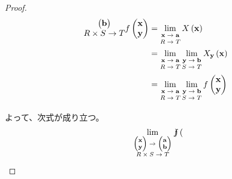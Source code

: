 \documentclass[dvipdfmx]{jsarticle}
\begin{document}
\begin{proof}
\begin{align*}
{\begin{matrix}
\begin{pmatrix}
\mathbf{b} \\
\end{pmatrix} \\ R \times S \rightarrow T \end{matrix}}{f\begin{pmatrix}
\mathbf{x} \\
\mathbf{y} \\
\end{pmatrix}} &= \lim_{\scriptsize \begin{matrix} \mathbf{x} \rightarrow \mathbf{a} \\ R \rightarrow T \end{matrix}}{X\left( \mathbf{x} \right)}\\
&= \lim_{\scriptsize \begin{matrix} \mathbf{x} \rightarrow \mathbf{a} \\ R \rightarrow T \end{matrix}}{\lim_{\scriptsize \begin{matrix} \mathbf{y} \rightarrow \mathbf{b} \\ S \rightarrow T \end{matrix}}{X_{\mathbf{y}}\left( \mathbf{x} \right)}}\\
&= \lim_{\scriptsize \begin{matrix} \mathbf{x} \rightarrow \mathbf{a} \\ R \rightarrow T \end{matrix}}{\lim_{\scriptsize \begin{matrix} \mathbf{y} \rightarrow \mathbf{b} \\ S \rightarrow T \end{matrix}}{f\begin{pmatrix}
\mathbf{x} \\
\mathbf{y} \\
\end{pmatrix}}}
\end{align*}\par
よって、次式が成り立つ。
\begin{align*}
\lim_{\scriptsize \begin{matrix} \begin{pmatrix}
\mathbf{x} \\
\mathbf{y} \\
\end{pmatrix} \rightarrow \begin{pmatrix}
\mathbf{a} \\
\mathbf{b} \\
\end{pmatrix} \\ R \times S \rightarrow T \end{matrix}}{f\begin{pmatrix}

\end{pmatrix}}
\end{align*}
\end{proof}
\end{document}
